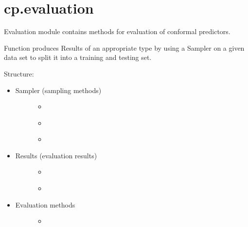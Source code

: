 \documentclass[letterpaper,10pt,english]{sphinxmanual}
\begin{document}
\section{cp.evaluation}
\label{cp.evaluation:cp-evaluation}\label{cp.evaluation:module-cp.evaluation}\label{cp.evaluation::doc}
Evaluation module contains methods for evaluation of conformal predictors.

Function {\hyperref[cp.evaluation:cp.evaluation.run]{}} produces Results of an appropriate type by using a Sampler on a given data set
to split it into a training and testing set.

Structure:
\begin{itemize}
\item {} \begin{description}
\item[{Sampler (sampling methods)}] \leavevmode\begin{itemize}
\item {} 
{\hyperref[cp.evaluation:cp.evaluation.RandomSampler]{}}

\item {} 
{\hyperref[cp.evaluation:cp.evaluation.CrossSampler]{}}

\item {} 
{\hyperref[cp.evaluation:cp.evaluation.LOOSampler]{}}

\end{itemize}

\end{description}

\item {} \begin{description}
\item[{Results (evaluation results)}] \leavevmode\begin{itemize}
\item {} 
{\hyperref[cp.evaluation:cp.evaluation.ResultsClass]{}}

\item {} 
{\hyperref[cp.evaluation:cp.evaluation.ResultsRegr]{}}

\end{itemize}

\end{description}

\item {} \begin{description}
\item[{Evaluation methods}] \leavevmode\begin{itemize}
\item {} 
{\hyperref[cp.evaluation:cp.evaluation.run]{}}


\end{itemize}
\end{description}
\end{itemize}
\end{document}
